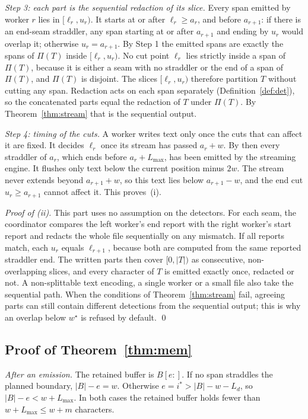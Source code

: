 \emph{Step 3: each part is the sequential redaction of its slice.} Every span emitted by worker $r$ lies in $[\ell_r, u_r)$. It starts at or after $\ell_r \ge a_r$, and before $a_{r+1}$: if there is an end-seam straddler, any span starting at or after $a_{r+1}$ and ending by $u_r$ would overlap it; otherwise $u_r = a_{r+1}$. By Step 1 the emitted spans are exactly the spans of $\Pi(T)$ inside $[\ell_r, u_r)$. No cut point $\ell_r$ lies strictly inside a span of $\Pi(T)$, because it is either a seam with no straddler or the end of a span of $\Pi(T)$, and $\Pi(T)$ is disjoint. The slices $[\ell_r, u_r)$ therefore partition $T$ without cutting any span. Redaction acts on each span separately (Definition~\ref{def:det}), so the concatenated parts equal the redaction of $T$ under $\Pi(T)$. By Theorem~\ref{thm:stream} that is the sequential output.

\emph{Step 4: timing of the cuts.} A worker writes text only once the cuts that can affect it are fixed. It decides $\ell_r$ once its stream has passed $a_r + w$. By then every straddler of $a_r$, which ends before $a_r + L_{\max}$, has been emitted by the streaming engine. It flushes only text below the current position minus $2w$. The stream never extends beyond $a_{r+1} + w$, so this text lies below $a_{r+1} - w$, and the end cut $u_r \ge a_{r+1}$ cannot affect it. This proves~(i).

\emph{Proof of (ii).} This part uses no assumption on the detectors. For each seam, the coordinator compares the left worker's end report with the right worker's start report and redacts the whole file sequentially on any mismatch. If all reports match, each $u_r$ equals $\ell_{r+1}$, because both are computed from the same reported straddler end. The written parts then cover $[0, |T|)$ as consecutive, non-overlapping slices, and every character of $T$ is emitted exactly once, redacted or not. A non-splittable text encoding, a single worker or a small file also take the sequential path. When the conditions of Theorem~\ref{thm:stream} fail, agreeing parts can still contain different detections from the sequential output; this is why an overlap below $w^{\star}$ is refused by default.
\qed

\subsection{Proof of Theorem~\ref{thm:mem}}

\emph{After an emission.} The retained buffer is $B[e{:}]$. If no span straddles the planned boundary, $|B| - e = w$. Otherwise $e = i^{*} > |B| - w - L_d$, so $|B| - e < w + L_{\max}$. In both cases the retained buffer holds fewer than $w + L_{\max} \le w + m$ characters.

